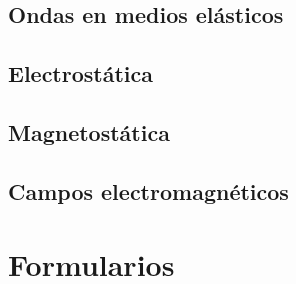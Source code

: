 \documentclass[a4paper]{book}
\begin{document}
\section{Ondas en medios elásticos}

\section{Electrostática}

\section{Magnetostática}

\section{Campos electromagnéticos}

\setlength{\parskip}{0em}
\chapter{Formularios}
\end{document}
